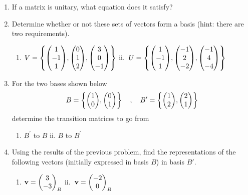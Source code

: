 \documentclass{article}
\begin{document}
\begin{enumerate}
  \vspace{2cm}
  \item If a matrix is unitary, what equation does it satisfy?
  \vspace{2cm}
  \item Determine whether or not these sets of vectors form a basis (hint: there are two requirements).
  \begin{enumerate}[label=i.]
    \item \( \displaystyle V = \left\{\mqty(1\\-1\\1),\mqty(0\\1\\2),\mqty(3\\0\\-1)\right\} \)
    \hspace{2cm}
    ii.\ \( \displaystyle U=\left\{\mqty(1\\-1\\1),\mqty(-1\\2\\-2),\mqty(-1\\4\\-4)\right\}\)
  \end{enumerate}
  \vspace{5cm}
  \item For the two bases shown below\\
    \begin{equation*}
      B=\left\{\mqty(1\\0),\mqty(0\\1)\right\}\quad,\quad B^\prime =\left\{\mqty(1\\2),\mqty(2\\1)\right\}
    \end{equation*}
    determine the transition matrices to go from
    \begin{enumerate}[label=i]
      \item $B^\prime$ to $B$\hspace{5cm} ii. $B$ to $B^\prime$
    \end{enumerate}
    \vspace{5cm}
  \item Using the results of the previous problem, find the representations of the following vectors (initially expressed in basis $B$) in basis $B'$.
  \begin{enumerate}[label=i]
    \item \( \displaystyle \vb{v}=\mqty(3\\-3)_{B} \) \hspace{5cm} ii.\ \( \displaystyle \vb{v}=\mqty(-2\\0)_B \)

\end{enumerate}
\end{enumerate}
\end{document}
